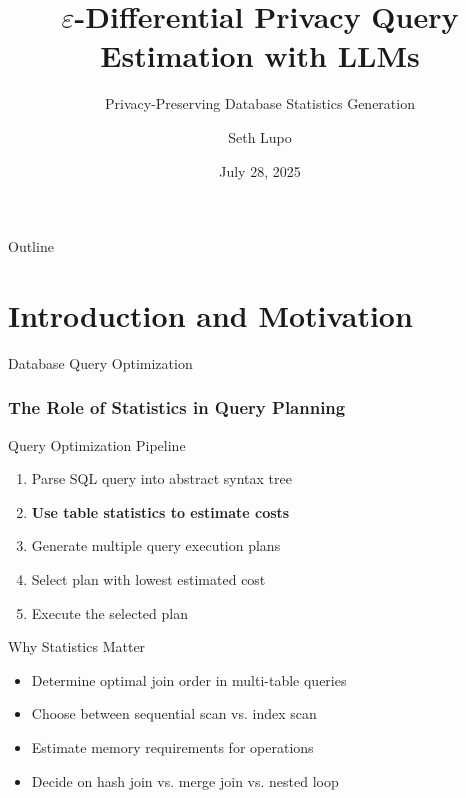 \documentclass{beamer}
\title{$\varepsilon$-Differential Privacy Query Estimation with LLMs}
\subtitle{Privacy-Preserving Database Statistics Generation}
\author{Seth Lupo}
\institute{Tufts Security and Privacy Lab\\
\texttt{seth.lupo@tufts.edu}}
\date{July 28, 2025}
\begin{document}
\begin{frame}
\titlepage
\end{frame}

\begin{frame}{Outline}
\tableofcontents
\end{frame}

\section{Introduction and Motivation}

\begin{frame}{Database Query Optimization}
\frametitle{The Role of Statistics in Query Planning}

\begin{block}{Query Optimization Pipeline}
\begin{enumerate}
    \item Parse SQL query into abstract syntax tree
    \item \textbf{Use table statistics to estimate costs}
    \item Generate multiple query execution plans
    \item Select plan with lowest estimated cost
    \item Execute the selected plan
\end{enumerate}
\end{block}

\vspace{0.5cm}

\begin{alertblock}{Why Statistics Matter}
\begin{itemize}
    \item Determine optimal join order in multi-table queries
    \item Choose between sequential scan vs. index scan
    \item Estimate memory requirements for operations
    \item Decide on hash join vs. merge join vs. nested loop
\end{itemize}
\end{alertblock}

\end{frame}
\end{document}
